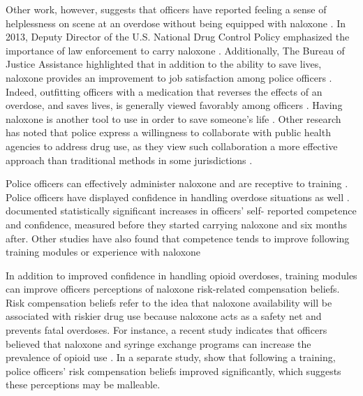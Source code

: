 Other work, however, suggests that officers have reported feeling a sense of helplessness on scene at an overdose without being equipped with naloxone \parencite{banta-green_police_2013, white_moving_2021}. In 2013, Deputy Director of the U.S. National Drug Control Policy emphasized the importance of law enforcement to carry naloxone \parencite{michael_botticelli_announcing_2013}. Additionally, The Bureau of Justice Assistance highlighted that in addition to the ability to save lives, naloxone provides an improvement to job satisfaction among police officers \parencite{bureau_of_justice_assistance_law_nodate}. Indeed, outfitting officers with a medication that reverses the effects of an overdose, and saves lives, is generally viewed favorably among officers \parencite{lloyd_its_2023, purviance_law_2017, wagner_training_2016, white_narcan_2021}. Having naloxone is another tool to use in order to save someone's life \parencite{lloyd_its_2023}. Other research has noted that police express a willingness to collaborate with public health agencies to address drug use, as  they view such collaboration a more effective approach than traditional methods in some jurisdictions \parencite{lloyd_its_2023, white_moving_2021}.

Police officers can effectively administer naloxone and are receptive to training \parencite{lloyd_its_2023, pourtaher_naloxone_2022, purviance_law_2017, wagner_training_2016}. Police officers have displayed confidence in handling overdose situations as well \parencite{purviance_law_2017, ray_police_2015}. \textcite{white_narcan_2021} documented statistically significant increases in officers’ self- reported competence and confidence, measured before they started carrying naloxone and six months after. Other studies have also found that competence tends to improve following training modules or experience with naloxone \parencite{wagner_training_2016} 

In addition to improved confidence in handling opioid overdoses, training modules can improve officers perceptions of naloxone risk-related compensation beliefs. Risk compensation beliefs refer to the idea that naloxone availability will be associated with riskier drug use because naloxone acts as a safety net and prevents fatal overdoses. For instance, a recent study indicates that officers believed that naloxone and syringe exchange programs can increase the prevalence of opioid use \parencite{reichert_police_2023}. In a separate study, \textcite{winograd_concerns_2019} show that following a training, police officers' risk compensation beliefs improved significantly, which suggests these perceptions may be malleable. 

